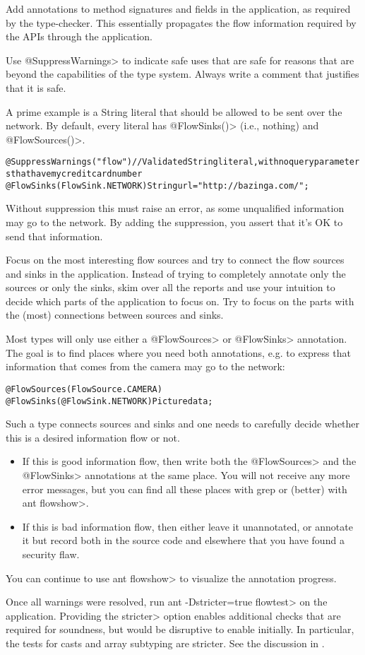 Add annotations to method signatures and fields in the application, as
required by the type-checker. This essentially propagates the flow
information required by the APIs through the application.

Use \<@SuppressWarnings> to indicate safe uses that are safe for reasons
that are beyond the capabilities of the type system. Always write a
comment that justifies that it is safe.

A prime example is a String literal that should be allowed to be sent
over the network. By default, every literal has \<@FlowSinks()>
(i.e., nothing) and \<@FlowSources()>.

\begin{alltt}
    @SuppressWarnings("flow") // Validated String literal, with no query parameters that have my credit card number
    @FlowSinks(FlowSink.NETWORK) String url = "http://bazinga.com/";
\end{alltt}

Without suppression this must raise an error, as some unqualified
information may go to the network. By adding the suppression, you
assert that it's OK to send that information.

Focus on the most interesting flow sources and try to connect the flow
sources and sinks in the application. Instead of trying to completely
annotate only the sources or only the sinks, skim over all the reports
and use your intuition to decide which parts of the application to
focus on. Try to focus on the parts with the (most) connections
between sources and sinks.

Most types will only use either a \<@FlowSources> or \<@FlowSinks>
annotation.
The goal is to find places where you need both annotations, e.g. to
express that information that comes from the camera may go to the
network:

\begin{alltt}
    @FlowSources(FlowSource.CAMERA)
    @FlowSinks(@FlowSink.NETWORK) Picture data;
\end{alltt}

Such a type connects sources and sinks and one needs to carefully
decide whether this is a desired information flow or not.
\begin{itemize}
\item If this is good information flow, then write both the \<@FlowSources>
  and the \<@FlowSinks> annotations at the same place. You will not
  receive any more error messages, but you can find all these places
  with grep or (better) with \<ant flowshow>.
\item If this is bad information flow, then either leave it unannotated,
  or annotate it but record both in the source code and elsewhere that
  you have found a security flaw.
\end{itemize}

You can continue to use \<ant flowshow> to visualize the annotation
progress.

Once all warnings were resolved, run \<ant -Dstricter=true flowtest> on
the application.
Providing the \<stricter> option enables additional checks that are
required for soundness, but would be disruptive to enable initially.
In particular, the tests for casts and array subtyping are stricter.
See the discussion in .
